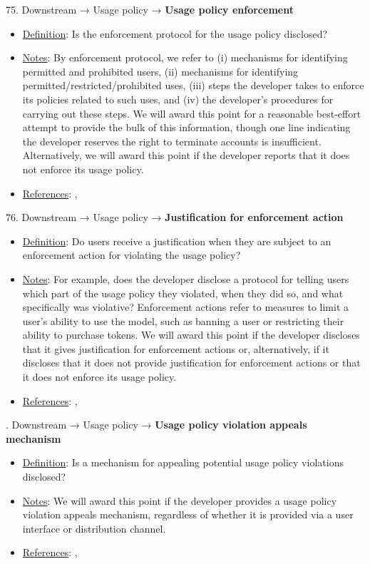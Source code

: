 75. Downstream → Usage policy → \textbf{Usage policy enforcement}
\vspace{-\parskip}
\begin{itemize}
\item
\underline{Definition}: Is the enforcement protocol for the usage policy disclosed?
\item
\underline{Notes}: By enforcement protocol, we refer to (i) mechanisms for identifying permitted and prohibited users, (ii) mechanisms for identifying permitted/restricted/prohibited uses, (iii) steps the developer takes to enforce its policies related to such uses, and (iv) the developer’s procedures for carrying out these steps. We will award this point for a reasonable best-effort attempt to provide the bulk of this information, though one line indicating the developer reserves the right to terminate accounts is insufficient. Alternatively, we will award this point if the developer reports that it does not enforce its usage policy.
\item
\underline{References}: \citet{cohere2022}, \citet{meta2023}
\end{itemize}


76. Downstream → Usage policy → \textbf{Justification for enforcement action}
\vspace{-\parskip}
\begin{itemize}
\item
\underline{Definition}: Do users receive a justification when they are subject to an enforcement action for violating the usage policy?
\item
\underline{Notes}: For example, does the developer disclose a protocol for telling users which part of the usage policy they violated, when they did so, and what specifically was violative? Enforcement actions refer to measures to limit a user’s ability to use the model, such as banning a user or restricting their ability to purchase tokens. We will award this point if the developer discloses that it gives justification for enforcement actions or, alternatively, if it discloses that it does not provide justification for enforcement actions or that it does not enforce its usage policy.
\item
\underline{References}: \citet{cohere2022}, \citet{meta2023}
\end{itemize}


. Downstream → Usage policy → \textbf{Usage policy violation appeals mechanism}
\vspace{-\parskip}
\begin{itemize}
\item
\underline{Definition}: Is a mechanism for appealing potential usage policy violations disclosed?
\item
\underline{Notes}: We will award this point if the developer provides a usage policy violation appeals mechanism, regardless of whether it is provided via a user interface or distribution channel.
\item
\underline{References}: \citet{cohere2022}, \citet{meta2023}
\end{itemize}


